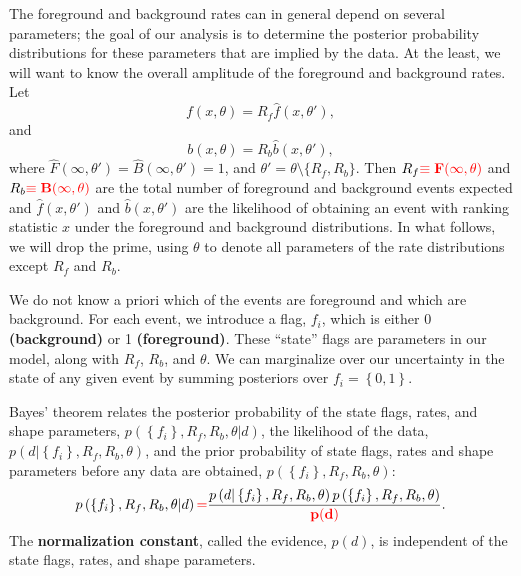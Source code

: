 \documentclass[aps,prd]{revtex4-1}
\newcommand{\mathset}[1]{\left\{ #1 \right\}}
\newcommand{\ilya}[1]{{\color{red} \bf #1}}
\begin{document}
The foreground and background rates can in general depend on several
parameters; the goal of our analysis is to determine the posterior
probability distributions for these parameters that are implied by the
data.  At the least, we will want to know the overall amplitude of the
foreground and background rates.  Let
\begin{equation}
  f(x,\theta) = R_f \hat{f}(x,\theta'),
\end{equation}
and 
\begin{equation}
  b(x, \theta) = R_b \hat{b}(x, \theta'),
\end{equation}
where $\hat{F}(\infty, \theta') = \hat{B}(\infty, \theta') = 1$, and
$\theta' = \theta \setminus \{R_{f}, R_{b} \}$.  Then $R_f\ilya{\equiv F(\infty,\theta)}$ and $R_b\ilya{\equiv B(\infty,\theta)}$
are the total number of foreground and background events expected and
$\hat{f}(x, \theta')$ and $\hat{b}(x, \theta')$ are the likelihood of
obtaining an event with ranking statistic $x$ under the foreground and
background distributions.  In what follows, we will drop the prime,
using $\theta$ to denote all parameters of the rate distributions
except $R_f$ and $R_b$.

We do not know a priori which of the events are foreground and which
are background.  For each event, we introduce a flag, $f_i$, which is
either 0 \ilya{(background)} or 1 \ilya{(foreground)}.  These ``state'' flags are parameters in our model, along with $R_f$, $R_b$, and $\theta$.  We can marginalize over our uncertainty in the state of
any given event by summing posteriors over $f_i = \mathset{0,1}$.

Bayes' theorem relates the posterior probability of the state flags,
rates, and shape parameters, $p\left(\mathset{f_i}, R_f, R_b, \theta |
  d \right)$, the likelihood of the data, $p\left( d | \mathset{f_i},
  R_f, R_b, \theta\right)$, and the prior probability of state flags,
rates and shape parameters before any data are obtained, $p\left(
  \mathset{f_i}, R_f, R_b, \theta\right)$:
\begin{equation}
  \label{eq:Bayes}
  p\left(\mathset{f_i}, R_f, R_b, \theta | d \right)  \ilya{=}
  \frac{p\left( d | \mathset{f_i}, R_f, R_b, \theta\right)
  p\left(\mathset{f_i}, R_f, R_b, \theta\right)}{\ilya{p(d)}}. 
\end{equation}
The \ilya{normalization constant}, called the evidence, $p(d)$, is independent of the state flags, rates, and shape parameters.
\end{document}
